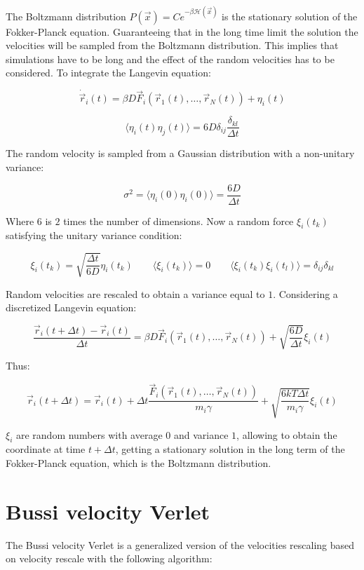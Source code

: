 	The Boltzmann distribution $P(\vec{x}) = Ce^{-\beta\mathcal{H}(\vec{x})}$ is the stationary solution of the Fokker-Planck equation.
	Guaranteeing that in the long time limit the solution the velocities will be sampled from the Boltzmann distribution.
	This implies that simulations have to be long and the effect of the random velocities has to be considered.
	To integrate the Langevin equation:

	$$\dot{\vec{r}}_i(t) = \beta D\vec{F}_i(\vec{r}_1(t), \dots, \vec{r}_N(t)) + \eta_i(t)$$

	$$\langle\eta_i(t)\eta_j(t)\rangle = 6D\delta_{ij}\frac{\delta_{kl}}{\Delta t}$$

	The random velocity is sampled from a Gaussian distribution with a non-unitary variance:

	$$\sigma^2 = \langle\eta_i(0)\eta_i(0)\rangle = \frac{6D}{\Delta t}$$

	Where $6$ is $2$ times the number of dimensions.
	Now a random force $\xi_i(t_k)$ satisfying the unitary variance condition:

	$$\xi_i(t_k) = \sqrt{\frac{\Delta t}{6D}}\eta_i(t_k)\qquad\langle\xi_i(t_k)\rangle = 0\qquad\langle\xi_i(t_k)\xi_i(t_l)\rangle = \delta_{ij}\delta_{kl}$$

	Random velocities are rescaled to obtain a variance equal to $1$.
	Considering a discretized Langevin equation:

	$$\frac{\vec{r}_i(t+ \Delta t) - \vec{r}_i(t)}{\Delta t} = \beta D\vec{F}_i(\vec{r}_1(t), \dots, \vec{r}_N(t)) + \sqrt{\frac{6D}{\Delta t}}\xi_i(t)$$

	Thus:

	$$\vec{r}_i(t + \Delta t) = \vec{r}_i(t) + \Delta t\frac{\vec{F}_i(\vec{r}_1(t), \dots, \vec{r}_N(t))}{m_i\gamma} + \sqrt{\frac{6kT\Delta t}{m_i\gamma}}\xi_i(t)$$

	$\xi_i$ are random numbers with average $0$ and variance $1$, allowing to obtain the coordinate at time $t+\Delta t$, getting a stationary solution in the long term of the Fokker-Planck equation, which is the Boltzmann distribution.

\section{Bussi velocity Verlet}
The Bussi velocity Verlet is a generalized version of the velocities rescaling based on velocity rescale with the following algorithm:

